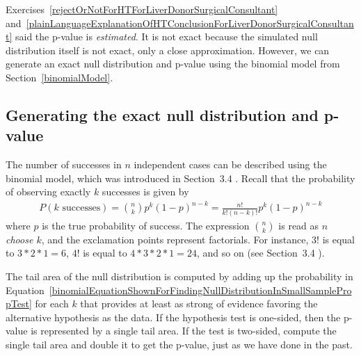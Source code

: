 Exercises~\ref{rejectOrNotForHTForLiverDonorSurgicalConsultant} and~\ref{plainLanguageExplanationOfHTConclusionForLiverDonorSurgicalConsultant} said the p-value is \emph{estimated}. It is not exact because the simulated null distribution itself is not exact, only a close approximation. However, we can generate an exact null distribution and p-value using the binomial model from Section~\ref{binomialModel}.

\subsection{Generating the exact null distribution and p-value}
\label{exactNullDistributionUsingBinomialModel}

The number of successes in $n$ independent cases can be described using the binomial model, which was introduced in Section~3.4%
. Recall that the probability of observing exactly $k$ successes is given by
\begin{align} \label{binomialEquationShownForFindingNullDistributionInSmallSamplePropTest}
P(k\text{ successes}) = {n\choose k} p^{k}(1-p)^{n-k} = \frac{n!}{k!(n-k)!} p^{k}(1-p)^{n-k}
\end{align}
where $p$ is the true probability of success. The expression ${n\choose k}$ is read as \emph{$n$ choose $k$}, and the exclamation points represent factorials. For instance, $3!$ is equal to $3*2*1=6$, $4!$ is equal to $4*3*2*1 = 24$, and so on (see Section~3.4%
).

The tail area of the null distribution is computed by adding up the probability in Equation~\eqref{binomialEquationShownForFindingNullDistributionInSmallSamplePropTest} for each $k$ that provides at least as strong of evidence favoring the alternative hypothesis as the data. If the hypothesis test is one-sided, then the p-value is represented by a single tail area. If the test is two-sided, compute the single tail area and double it to get the p-value, just as we have done in the past.

